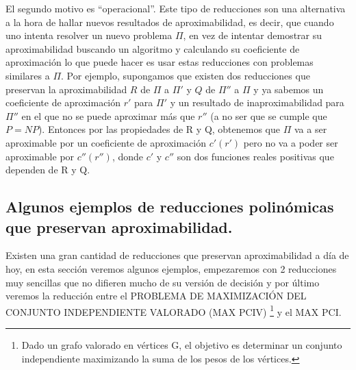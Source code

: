 \documentclass[a4paper,12pt,titlepage]{article}
\begin{document}
El segundo motivo es ``operacional''. Este tipo de reducciones son una alternativa a la hora de hallar nuevos resultados de aproximabilidad, es decir, que cuando uno intenta resolver un nuevo problema $\Pi$, en vez de intentar demostrar su aproximabilidad buscando un algoritmo y calculando su coeficiente de aproximaci\'on lo que puede hacer es usar estas reducciones con problemas similares a $\Pi$. Por ejemplo, supongamos que existen dos reducciones que preservan la aproximabilidad $R$ de $\Pi$ a $\Pi'$ y $Q$ de $\Pi''$ a $\Pi$ y ya sabemos un coeficiente de aproximaci\'on $r'$ para $\Pi'$ y un resultado de inaproximabilidad para $\Pi''$ en el que no se puede aproximar m\'as que $r''$ (a no ser que se cumple que $P=NP$). Entonces por las propiedades de R y Q, obtenemos que $\Pi$ va a ser aproximable por un coeficiente de aproximaci\'on $c'(r')$ pero no va a poder ser aproximable por $c''(r'')$, donde $c'$ y $c''$ son dos funciones reales positivas que dependen de R y Q.

\subsection{Algunos ejemplos de reducciones polin\'omicas que preservan aproximabilidad.}

Existen una gran cantidad de reducciones que preservan aproximabilidad a d\'ia de hoy, en esta secci\'on veremos algunos ejemplos, empezaremos con 2 reducciones muy sencillas que no difieren mucho de su versi\'on de decisi\'on y por \'ultimo veremos la reducci\'on entre el PROBLEMA DE MAXIMIZACI\'ON DEL CONJUNTO INDEPENDIENTE VALORADO (MAX PCIV) \footnote{Dado un grafo valorado en v\'ertices G, el objetivo es determinar un conjunto independiente maximizando la suma de los pesos de los v\'ertices.} y el MAX PCI.
\end{document}

